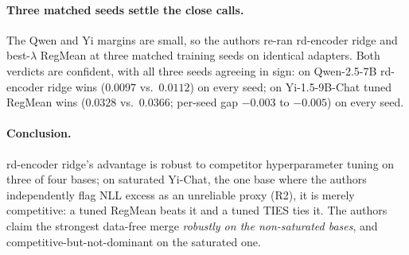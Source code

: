 \paragraph{Three matched seeds settle the close calls.} The Qwen and
Yi margins are small, so the authors re-ran rd-encoder ridge and best-$\lambda$
RegMean at three matched training seeds on identical adapters. Both
verdicts are confident, with all three seeds agreeing in sign: on
Qwen-2.5-7B rd-encoder ridge wins ($0.0097$ vs.\ $0.0112$) on every
seed; on Yi-1.5-9B-Chat tuned RegMean wins ($0.0328$ vs.\ $0.0366$;
per-seed gap $-0.003$ to $-0.005$) on every seed.

\paragraph{Conclusion.} rd-encoder ridge's advantage is robust to
competitor hyperparameter tuning on three of four bases; on saturated
Yi-Chat, the one base where the authors independently flag NLL excess as an
unreliable proxy (R2), it is merely competitive: a tuned RegMean
beats it and a tuned TIES ties it. The authors claim the strongest data-free
merge \emph{robustly on the non-saturated bases}, and
competitive-but-not-dominant on the saturated one.
